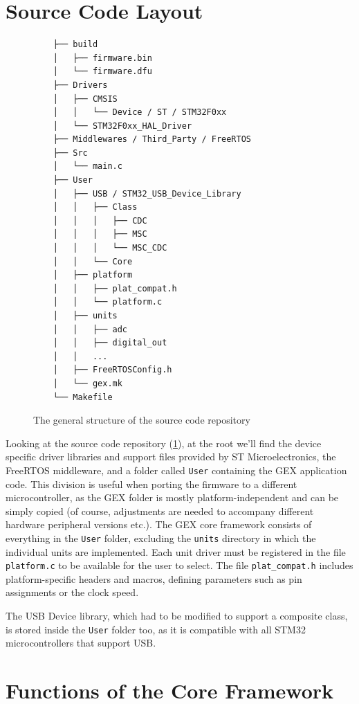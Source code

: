 \section{Source Code Layout}

\begin{figure}
	\scriptsize\vspace{-3em}
	\begin{verbatim}
	├── build
	│   ├── firmware.bin
	│   └── firmware.dfu
	├── Drivers
	│   ├── CMSIS
	│   │   └── Device / ST / STM32F0xx
	│   └── STM32F0xx_HAL_Driver
	├── Middlewares / Third_Party / FreeRTOS
	├── Src
	│   └── main.c
	├── User
	│   ├── USB / STM32_USB_Device_Library
	│   │   ├── Class
	│   │   │   ├── CDC
	│   │   │   ├── MSC
	│   │   │   └── MSC_CDC
	│   │   └── Core
	│   ├── platform
	│   │   ├── plat_compat.h
	│   │   └── platform.c
	│   ├── units
	│   │   ├── adc
	│   │   ├── digital_out
	│   │   ...
	│   ├── FreeRTOSConfig.h
	│   └── gex.mk
	└── Makefile
	\end{verbatim}
	\vspace{-1em}
	\caption{\label{fig:repo-structure} The general structure of the source code repository}
\end{figure}

Looking at the source code repository (\cref{fig:repo-structure}), at the root we'll find the device specific driver libraries and support files provided by ST Microelectronics, the FreeRTOS middleware, and a folder called \verb|User| containing the GEX application code. This division is useful when porting the firmware to a different microcontroller, as the GEX folder is mostly platform-independent and can be simply copied (of course, adjustments are needed to accompany different hardware peripheral versions etc.). The GEX core framework consists of everything in the \verb|User| folder, excluding the \verb|units| directory in which the individual units are implemented. Each unit driver must be registered in the file \verb|platform.c| to be available for the user to select. The file \verb|plat_compat.h| includes platform-specific headers and macros, defining parameters such as pin assignments or the clock speed.

The \gls{USB} Device library, which had to be modified to support a composite class, is stored inside the \verb|User| folder too, as it is compatible with all STM32 microcontrollers that support \gls{USB}.


\section{Functions of the Core Framework}

